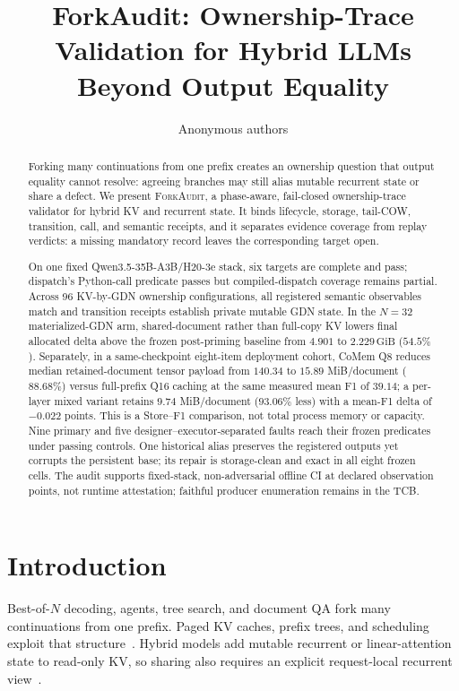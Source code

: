 \documentclass{article}
\title{ForkAudit: Ownership-Trace Validation for Hybrid LLMs Beyond Output Equality}
\author{Anonymous authors}
\newcommand{\method}{\textsc{ForkAudit}}
\newcommand{\gib}{\,\mathrm{GiB}}
\begin{document}
\raggedbottom
\maketitle

\begin{abstract}
Forking many continuations from one prefix creates an ownership question that
output equality cannot resolve: agreeing branches may still alias mutable
recurrent state or share a defect.  We present \method{}, a phase-aware,
fail-closed ownership-trace validator for hybrid KV and recurrent state.  It
binds lifecycle, storage, tail-COW, transition, call, and semantic receipts,
and it separates evidence coverage from replay verdicts: a missing mandatory
record leaves the corresponding target open.

On one fixed Qwen3.5-35B-A3B/H20-3e stack, six targets are complete and pass;
dispatch's Python-call predicate passes but compiled-dispatch coverage remains
partial.  Across 96 KV-by-GDN ownership configurations, all registered semantic
observables match and transition receipts establish private mutable GDN state.
In the $N=32$ materialized-GDN arm, shared-document rather than full-copy KV
lowers final allocated delta above the frozen post-priming baseline from
$4.901$ to $2.229\gib$ ($54.5\%$).  Separately, in a same-checkpoint eight-item
deployment cohort, CoMem Q8
reduces median retained-document tensor payload from $140.34$ to $15.89$
MiB/document ($88.68\%$) versus full-prefix Q16 caching at the same measured mean
F1 of $39.14$; a per-layer mixed variant retains $9.74$ MiB/document ($93.06\%$
less) with a mean-F1 delta of $-0.022$ points.  This is a Store--F1 comparison,
not total process memory or capacity.  Nine primary and five
designer--executor-separated faults reach their frozen predicates under passing
controls.  One historical alias preserves the registered outputs yet corrupts
the persistent base; its repair is storage-clean and exact in all eight frozen
cells.  The audit supports fixed-stack,
non-adversarial offline CI at declared observation points, not runtime
attestation; faithful producer enumeration remains in the TCB.
\end{abstract}

\section{Introduction}
\label{sec:intro}

Best-of-$N$ decoding, agents, tree search, and document QA fork many
continuations from one prefix.  Paged KV caches, prefix trees, and scheduling
exploit that structure~\citep{kwon2023pagedattention,zheng2024sglang,
gim2024promptcache,srivatsa2025preble}.  Hybrid models add mutable recurrent or
linear-attention state to read-only KV, so sharing also requires an explicit
request-local recurrent view~\citep{yang2025gateddeltanet,lieber2025jamba,
pan2025marconi}.
\end{document}
